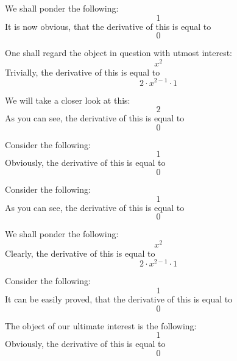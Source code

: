 \documentclass{article}
\begin{document}
We shall ponder the following:
\begin{equation}
1 
\end{equation}
It is now obvious, that the derivative of this is equal to
\begin{equation}
0 
\end{equation}

One shall regard the object in question with utmost interest:
\begin{equation}
x ^{2 } 
\end{equation}
Trivially, the derivative of this is equal to
\begin{equation}
2 \cdot x ^{2 - 1 } \cdot 1 
\end{equation}

We will take a closer look at this:
\begin{equation}
2 
\end{equation}
As you can see, the derivative of this is equal to
\begin{equation}
0 
\end{equation}

Consider the following:
\begin{equation}
1 
\end{equation}
Obviously, the derivative of this is equal to
\begin{equation}
0 
\end{equation}

Consider the following:
\begin{equation}
1 
\end{equation}
As you can see, the derivative of this is equal to
\begin{equation}
0 
\end{equation}

We shall ponder the following:
\begin{equation}
x ^{2 } 
\end{equation}
Clearly, the derivative of this is equal to
\begin{equation}
2 \cdot x ^{2 - 1 } \cdot 1 
\end{equation}

Consider the following:
\begin{equation}
1 
\end{equation}
It can be easily proved, that the derivative of this is equal to
\begin{equation}
0 
\end{equation}

The object of our ultimate interest is the following:
\begin{equation}
1 
\end{equation}
Obviously, the derivative of this is equal to
\begin{equation}
0 
\end{equation}
\end{document}
